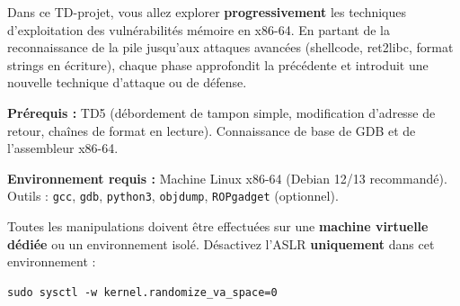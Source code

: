 \documentclass[a4paper,11pt]{article}
\theoremstyle{plain}
\theoremstyle{definition}
\begin{document}
\noindent
Dans ce TD-projet, vous allez explorer \textbf{progressivement} les techniques d'exploitation des vulnérabilités mémoire en x86-64. En partant de la reconnaissance de la pile jusqu'aux attaques avancées (shellcode, ret2libc, format strings en écriture), chaque phase approfondit la précédente et introduit une nouvelle technique d'attaque ou de défense.

\medskip
\noindent\textbf{Prérequis :} TD5 (débordement de tampon simple, modification d'adresse de retour, chaînes de format en lecture). Connaissance de base de GDB et de l'assembleur x86-64.

\medskip
\noindent\textbf{Environnement requis :} Machine Linux x86-64 (Debian 12/13 recommandé). Outils : \texttt{gcc}, \texttt{gdb}, \texttt{python3}, \texttt{objdump}, \texttt{ROPgadget} (optionnel).

\bigskip

\begin{attention}
Toutes les manipulations doivent être effectuées sur une \textbf{machine virtuelle dédiée} ou un environnement isolé. Désactivez l'ASLR \textbf{uniquement} dans cet environnement :
\begin{lstlisting}[style=GDBStyle]
sudo sysctl -w kernel.randomize_va_space=0
\end{lstlisting}
\end{attention}

\bigskip

\end{document}
